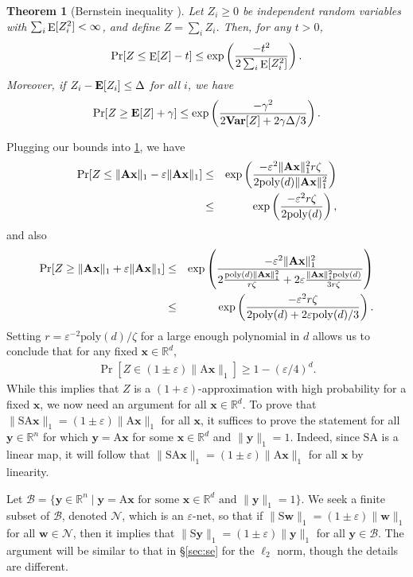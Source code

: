 \documentclass[11pt]{article}
\newtheorem{theorem}{Theorem}
\newcommand{\mat}[1]{{\ensuremath{\bm{\mathrm{#1}}}}}
\def\matA{\mat{A}}
\def\matS{\mat{S}}
\def\w{{\mathbf{w}}}
\def\frac#1#2{{#1\over #2}}
\def\x{{\mathbf x}}
\def\y{{\mathbf y}}
\newcommand{\eps}{\varepsilon}
\newcommand{\poly}{{\mathrm{poly}}}
\newcommand{\Exp}{\mathop{\mathrm E}\displaylimits}
\begin{document}
\begin{theorem}[Bernstein inequality \cite{m03}]
\label{thm:bernstein}
Let $Z_i\ge 0$ be independent random variables with 
$\sum_{i}\Exp[Z_i^2]<\infty$, and define
$Z=\sum_{i}Z_i$. 
Then, for any $t>0$,
$$\Pr[Z\le \Exp[Z]-t]\le\exp\left(\frac{-t^2}{2\sum_i\Exp[Z_i^2]}\right).$$
Moreover, if $Z_i - {\bf E}[Z_i] \leq \Delta$ for all $i$, we have
$$\Pr[Z \geq {\bf E}[Z] + \gamma] \leq 
\exp \left (\frac{-\gamma^2}{2{\bf Var}[Z] + 2\gamma \Delta/3} \right ).$$
\end{theorem}
Plugging our bounds into \ref{thm:bernstein}, we have
\begin{eqnarray*}
\Pr[Z \leq  \|\matA \x\|_1 - \eps \|\matA \x\|_1] & \le & 
\exp \left (\frac{-\eps^2 \|\matA \x\|_1^2r \zeta}{2 \poly(d) \|\matA \x\|_1^2} \right )\\
& \le & \exp \left (\frac{-\eps^2 r \zeta}{2 \poly(d)} \right ),
\end{eqnarray*}
and also
\begin{eqnarray*}
\Pr[Z \geq \|\matA \x\|_1 + \eps \|\matA \x\|_1] & \le & 
\exp \left (\frac{-\eps^2 \|\matA \x\|_1^2}{2\frac{\poly(d) \|\matA \x\|_1^2}{r \zeta} 
+ 2\eps \frac{\|\matA \x\|_1^2 \poly(d)}{3r \zeta}} \right ) \\
& \le & \exp \left (\frac{-\eps^2 r \zeta}{2 \poly(d) + 2 \eps \poly(d)/3} \right ).
\end{eqnarray*}
Setting $r = \eps^{-2} \poly(d)/\zeta$ 
for a large enough polynomial in $d$ allows us to conclude that for any fixed $\x \in \mathbb{R}^d$,
\begin{eqnarray}\label{eqn:tail}
\Pr[Z \in (1 \pm \eps)\|\matA \x\|_1] \geq 1- (\eps/4)^d.
\end{eqnarray}
While this implies that $Z$ is a $(1+\eps)$-approximation with high probability for a fixed $\x$, 
we now need an argument for all $\x \in \mathbb{R}^d$.
To prove that $\|\matS \matA \x\|_1 = (1\pm \eps)\|\matA \x\|_1$ 
for all $\x$, it suffices to prove the statement for all $\y \in \mathbb{R}^n$
for which $\y = \matA \x$ for some $\x \in \mathbb{R}^d$ and $\|\y\|_1 = 1$. 
Indeed, since $\matS \matA$ is a linear map, it will follow that $\|\matS \matA \x\|_1 = (1\pm \eps)\|\matA \x\|_1$
for all $\x$ by linearity. 

Let $\mathcal{B} = \{\y \in \mathbb{R}^n \mid \y 
= \matA \x \textrm{ for some } \x \in \mathbb{R}^d \textrm{ and } \|\y\|_1 = 1\}$. We seek a finite subset of
$\mathcal{B}$, denoted $\mathcal{N}$, which is an $\eps$-net, 
so that if $\|\matS \w\|_1 = (1 \pm \eps)\|\w\|_1$ for all $\w \in \mathcal{N}$, then
it implies that $\|\matS \y\|_1 = (1 \pm \eps)\|\y\|_1$ for all $\y \in \mathcal{B}$. The argument will be similar
to that in \S\ref{sec:se} for the $\ell_2$ norm, though the details are different. 
\end{document}
